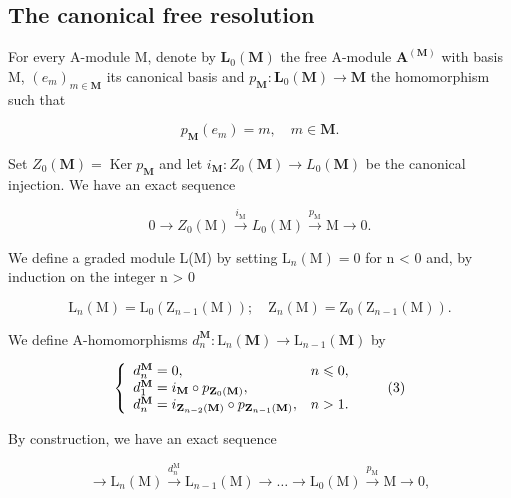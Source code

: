 \subsection{The canonical free resolution}

For every A-module M, denote by \(\mathbf{L}_{0}(\mathbf{M})\) the free A-module \(\mathbf{A}^{(\mathbf{M})}\) with basis M, \((e_{m})_{m\in\mathbf{M}}\) its canonical basis and \(p_{\mathbf{M}}:\mathbf{L}_{0}(\mathbf{M})\to\mathbf{M}\) the homomorphism such that

\[
p _ {\mathbf {M}} (e _ {m}) = m, \quad m \in \mathbf {M}.
\]

Set \(Z_0(\mathbf{M}) = \operatorname{Ker} p_{\mathbf{M}}\) and let \(i_{\mathbf{M}}: Z_0(\mathbf{M}) \to L_0(\mathbf{M})\) be the canonical injection. We have an exact sequence

\[
0 \longrightarrow Z _ {0} (\mathrm{M}) \stackrel {i _ {\mathrm{M}}} {\longrightarrow} L _ {0} (\mathrm{M}) \stackrel {p _ {\mathrm{M}}} {\longrightarrow} \mathrm{M} \longrightarrow 0.\tag{1}
\]

We define a graded module L(M) by setting \(\mathrm{L}_{n}(\mathrm{M}) = 0\) for n \textless{} 0 and, by induction on the integer n \textgreater{} 0

\[
\mathrm{L} _ {n} (\mathrm{M}) = \mathrm{L} _ {0} \left(\mathrm{Z} _ {n - 1} (\mathrm{M})\right); \quad \mathrm{Z} _ {n} (\mathrm{M}) = \mathrm{Z} _ {0} \left(\mathrm{Z} _ {n - 1} (\mathrm{M})\right).\tag{2}
\]

We define A-homomorphisms \(d_{n}^{\mathbf{M}}:\mathrm{L}_{n}(\mathbf{M})\to \mathrm{L}_{n - 1}(\mathbf{M})\) by

\[
\left\{ \begin{array}{l l} d _ {n} ^ {\mathbf {M}} = 0, & n \leqslant 0, \\ d _ {1} ^ {\mathbf {M}} = i _ {\mathbf {M}} \circ p _ {\mathbf {Z} _ {0} (\mathbf {M})}, & \\ d _ {n} ^ {\mathbf {M}} = i _ {\mathbf {Z} _ {n - 2} (\mathbf {M})} \circ p _ {\mathbf {Z} _ {n - 1} (\mathbf {M})}, & n > 1. \end{array} \right.\tag{3}
\]

By construction, we have an exact sequence

\[
\longrightarrow \mathrm{L} _ {n} (\mathrm{M}) \xrightarrow {d _ {n} ^ {\mathrm{M}}} \mathrm{L} _ {n - 1} (\mathrm{M}) \longrightarrow \dots \longrightarrow \mathrm{L} _ {0} (\mathrm{M}) \xrightarrow {p _ {\mathrm{M}}} \mathrm{M} \longrightarrow 0,
\]

